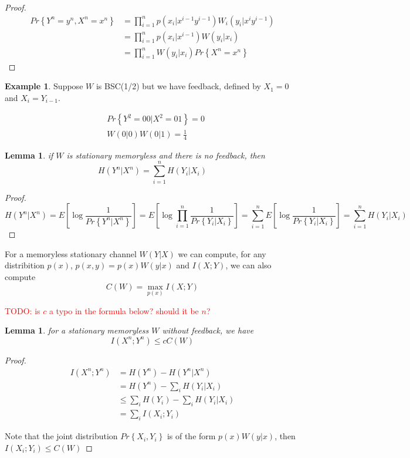 \documentclass{article}
\newtheorem{lemma}[theorem]{Lemma}
\theoremstyle{definition} %
\newtheorem{example}{Example}
\newcommand{\todo}[1]{\textcolor{red}{TODO: #1}}
\renewcommand{\Pr}[1]{Pr\left\{#1\right\}}
\newcommand{\Ex}[1]{E\left[#1\right]}
\begin{document}
\begin{proof}
  \begin{align*}
    \Pr{Y^n=y^n, X^n=x^n} &= \prod_{i=1}^n p(x_i|x^{i-1}y^{i-1})W_i(y_i|x^iy^{i-1})\\
    &= \prod_{i=1}^n p(x_i|x^{i-1})W(y_i|x_i)\\
    &= \prod_{i=1}^n W(y_i|x_i) \Pr{X^n=x^n}
  \end{align*}
\end{proof}

\begin{example}
  Suppose $W$ is BSC(1/2) but we have feedback, defined by $X_1=0$ and $X_i=Y_{i-1}$.

  \begin{align*}
    &\Pr{Y^2=00|X^2=01} = 0\\
    &W(0|0)W(0|1) = \frac 1 4
  \end{align*}

\end{example}

\begin{lemma}
  if $W$ is stationary memoryless and there is no feedback, then
  \[
    H(Y^n|X^n) = \sum_{i=1}^n H(Y_i|X_i)
  \]

\end{lemma}

\begin{proof}
  \[
    H(Y^n|X^n) = \Ex{\log \frac 1 {\Pr{Y^n|X^n}}}
    = \Ex{\log \prod_{i=1}^n \frac 1 {\Pr{Y_i|X_i}}}
    = \sum_{i=1}^n \Ex{\log \frac 1 {\Pr{Y_i|X_i}}}
    = \sum_{i=1}^n H(Y_i|X_i)
  \]
\end{proof}

For a memoryless stationary channel $W(Y|X)$ we can compute, for any
distribition $p(x)$, $p(x,y) = p(x)W(y|x)$ and $I(X;Y)$, we can also compute
\[
  C(W) = \max_{p(x)} I(X;Y)
\]

\todo{is $c$ a typo in the formula below? should it be $n$?}
\begin{lemma}
  for a stationary memoryless $W$ without feedback, we have
  \[
    I(X^n;Y^n) \leq c C(W)
  \]
\end{lemma}


\begin{proof}
  \begin{align*}
    I(X^n;Y^n) &= H(Y^n) - H(Y^n|X^n)\\
    &= H(Y^n)- \sum_i H(Y_i|X_i)\\
    &\leq \sum_i H(Y_i) - \sum_i H(Y_i|X_i)\\
    &= \sum_i I(X_i;Y_i)
  \end{align*}

  Note that the joint distribution $\Pr{X_i,Y_i}$ is of the form $p(x)W(y|x)$, then $I(X_i;Y_i) \leq C(W)$
\end{proof}
\end{document}
